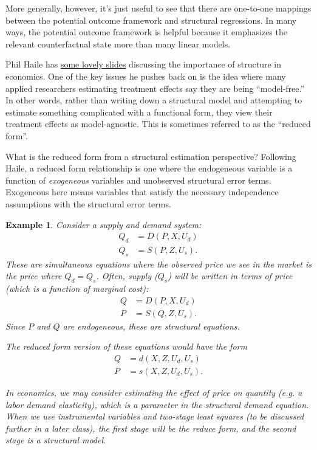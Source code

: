 \documentclass{tufte-handout}
\theoremstyle{break}
\newtheorem{exmp}{Example}
\begin{document}

More generally, however, it's just useful to see that there are one-to-one mappings between the potential outcome framework and structural regressions. In many ways, the potential outcome framework is helpful because it emphasizes the relevant counterfactual state more than many linear models. 

Phil Haile has \href{https://www.princeton.edu/~reddings/tradephd/Haile_theorymeas.pdf}{some lovely slides} discussing the importance of structure in economics. One of the key issues he pushes back on is the idea where many applied researchers estimating treatment effects say they are being ``model-free.'' In other words, rather than writing down a structural model and attempting to estimate something complicated with a functional form, they view their treatment effects as model-agnostic. This is sometimes referred to as the ``reduced form''.

What is the reduced form from a structural estimation perspective? Following Haile, a reduced form relationship is one where the endogeneous variable is a function of \emph{exogeneous} variables and unobserved structural error terms. Exogeneous here means variables that satisfy the necessary independence assumptions with the structural error terms.



\begin{boxD}
  \begin{exmp}
Consider a supply and demand system:
\begin{align*}
  Q_{d} &= D(P, X, U_{d})\\
  Q_{s} &= S(P, Z, U_{s}).
\end{align*}
These are simultaneous equations where the observed price we see in the market is the price where $Q_{d} = Q_{s}$. 
Often, supply ($Q_{s}$) will be written in terms of price (which is a function of marginal cost):
\begin{align*}
  Q &= D(P, X, U_{d})\\
  P &= S(Q, Z, U_{s}).
\end{align*}
Since $P$ and $Q$ are endogeneous, these are \emph{structural} equations. 
\linebreak

The reduced form version of these equations would have the form
\begin{align*}
  Q &= d(X, Z, U_{d}, U_{s})\\
 P &= s(X, Z, U_{d}, U_{s}).
\end{align*}

In economics, we may consider estimating the effect of price on quantity (e.g. a labor demand elasticity), which is a parameter in the structural demand equation. When we use instrumental variables and two-stage least squares (to be discussed further in a later class), the \emph{first stage} will be the reduce form, and the second stage is a structural model.
  \end{exmp}
  \end{boxD}
\end{document}
